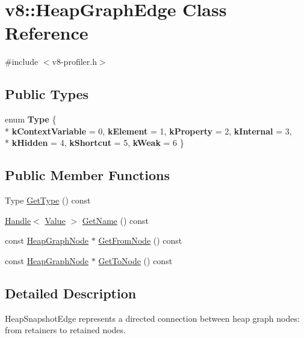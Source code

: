 \hypertarget{classv8_1_1HeapGraphEdge}{\section{v8\-:\-:Heap\-Graph\-Edge Class Reference}
\label{classv8_1_1HeapGraphEdge}
}


{\ttfamily \#include $<$v8-\/profiler.\-h$>$}

\subsection*{Public Types}
\begin{DoxyCompactItemize}
\item 
enum {\bfseries Type} \{ \\*
{\bfseries k\-Context\-Variable} =  0, 
{\bfseries k\-Element} =  1, 
{\bfseries k\-Property} =  2, 
{\bfseries k\-Internal} =  3, 
\\*
{\bfseries k\-Hidden} =  4, 
{\bfseries k\-Shortcut} =  5, 
{\bfseries k\-Weak} =  6
 \}
\end{DoxyCompactItemize}
\subsection*{Public Member Functions}
\begin{DoxyCompactItemize}
\item 
Type \hyperlink{classv8_1_1HeapGraphEdge_a7f4923098074ee4c47d901f363728d08}{Get\-Type} () const 
\item 
\hyperlink{classv8_1_1Handle}{Handle}$<$ \hyperlink{classv8_1_1Value}{Value} $>$ \hyperlink{classv8_1_1HeapGraphEdge_aa91362db6bfdbecfc48d3ba57d292705}{Get\-Name} () const 
\item 
const \hyperlink{classv8_1_1HeapGraphNode}{Heap\-Graph\-Node} $\ast$ \hyperlink{classv8_1_1HeapGraphEdge_acd43a5082f1862b7c0c0094fc75af631}{Get\-From\-Node} () const 
\item 
const \hyperlink{classv8_1_1HeapGraphNode}{Heap\-Graph\-Node} $\ast$ \hyperlink{classv8_1_1HeapGraphEdge_ad8fd8fa121a0e778a8b120a0c5fa227c}{Get\-To\-Node} () const 
\end{DoxyCompactItemize}


\subsection{Detailed Description}
Heap\-Snapshot\-Edge represents a directed connection between heap graph nodes\-: from retainers to retained nodes. 

